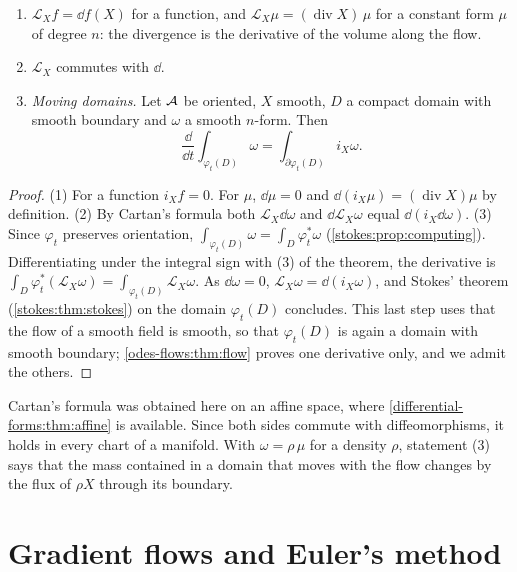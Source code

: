 \begin{notechapter}
\begin{corollary}\label{odes-flows:cor:lie}
\begin{enumerate}[nosep]
  \item $\mathcal L_Xf = \dd f(X)$ for a function, and
        $\mathcal L_X\mu = (\operatorname{div}X)\,\mu$ for a constant
        form $\mu$ of degree $n$: the divergence is the derivative of
        the volume along the flow.
  \item $\mathcal L_X$ commutes with $\dd$.
  \item \emph{Moving domains.} Let $\mathcal{A}$ be oriented, $X$ smooth,
        $D$ a compact domain with smooth boundary and $\omega$ a
        smooth $n$-form. Then
        \[
          \frac{\dd}{\dd t}\int_{\varphi_t(D)}\omega
          = \int_{\partial\varphi_t(D)}i_X\omega .
        \]
\end{enumerate}
\end{corollary}

\begin{proof}
(1) For a function $i_Xf = 0$. For $\mu$, $\dd\mu = 0$ and
$\dd(i_X\mu) = (\operatorname{div}X)\mu$ by definition. (2) By
Cartan's formula both $\mathcal L_X\dd\omega$ and
$\dd\mathcal L_X\omega$ equal $\dd(i_X\dd\omega)$. (3) Since
$\varphi_t$ preserves orientation,
$\int_{\varphi_t(D)}\omega = \int_D\varphi_t^*\omega$
(\cref{stokes:prop:computing}). Differentiating under the integral
sign with (3) of the theorem, the derivative is
$\int_D\varphi_t^*(\mathcal L_X\omega)
= \int_{\varphi_t(D)}\mathcal L_X\omega$. As $\dd\omega = 0$,
$\mathcal L_X\omega = \dd(i_X\omega)$, and Stokes' theorem
(\cref{stokes:thm:stokes}) on the domain $\varphi_t(D)$ concludes.
This last step uses that the flow of a smooth field is smooth, so that
$\varphi_t(D)$ is again a domain with smooth boundary;
\cref{odes-flows:thm:flow} proves one derivative only, and we admit
the others.
\end{proof}

Cartan's formula was obtained here on an affine space, where
\cref{differential-forms:thm:affine} is available. Since both sides
commute with diffeomorphisms, it holds in every chart of a manifold.
With $\omega = \rho\,\mu$ for a density $\rho$, statement (3) says
that the mass contained in a domain that moves with the flow changes
by the flux of $\rho X$ through its boundary.

\section{Gradient flows and Euler's method}
\label{odes-flows:sec:gradient}


\end{notechapter}
